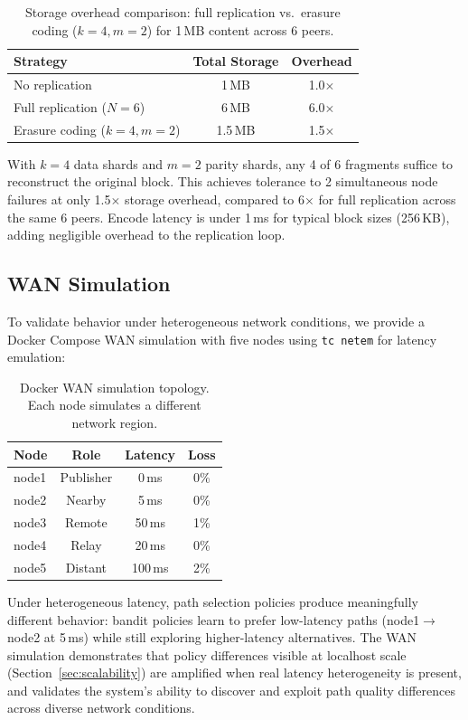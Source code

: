 \documentclass[sigconf,nonacm]{acmart}
\begin{document}
\begin{table}[t]
\caption{Storage overhead comparison: full replication vs.\ erasure coding ($k{=}4, m{=}2$) for 1\,MB content across 6 peers.}
\label{tab:erasure}
\centering
\begin{tabular}{lcc}
\toprule
Strategy & Total Storage & Overhead \\
\midrule
No replication & 1\,MB & 1.0$\times$ \\
Full replication ($N{=}6$) & 6\,MB & 6.0$\times$ \\
Erasure coding ($k{=}4, m{=}2$) & 1.5\,MB & 1.5$\times$ \\
\bottomrule
\end{tabular}
\end{table}

With $k{=}4$ data shards and $m{=}2$ parity shards, any 4 of 6 fragments suffice to reconstruct the original block. This achieves tolerance to 2 simultaneous node failures at only 1.5$\times$ storage overhead, compared to 6$\times$ for full replication across the same 6 peers. Encode latency is under 1\,ms for typical block sizes (256\,KB), adding negligible overhead to the replication loop.

\subsection{WAN Simulation}
\label{sec:wan}

To validate behavior under heterogeneous network conditions, we provide a Docker Compose WAN simulation with five nodes using \texttt{tc netem} for latency emulation:

\begin{table}[t]
\caption{Docker WAN simulation topology. Each node simulates a different network region.}
\label{tab:docker}
\centering
\small
\begin{tabular}{lccc}
\toprule
Node & Role & Latency & Loss \\
\midrule
node1 & Publisher & 0\,ms & 0\% \\
node2 & Nearby & 5\,ms & 0\% \\
node3 & Remote & 50\,ms & 1\% \\
node4 & Relay & 20\,ms & 0\% \\
node5 & Distant & 100\,ms & 2\% \\
\bottomrule
\end{tabular}
\end{table}

Under heterogeneous latency, path selection policies produce meaningfully different behavior: bandit policies learn to prefer low-latency paths (node1$\to$node2 at 5\,ms) while still exploring higher-latency alternatives. The WAN simulation demonstrates that policy differences visible at localhost scale (Section~\ref{sec:scalability}) are amplified when real latency heterogeneity is present, and validates the system's ability to discover and exploit path quality differences across diverse network conditions.
\end{document}
